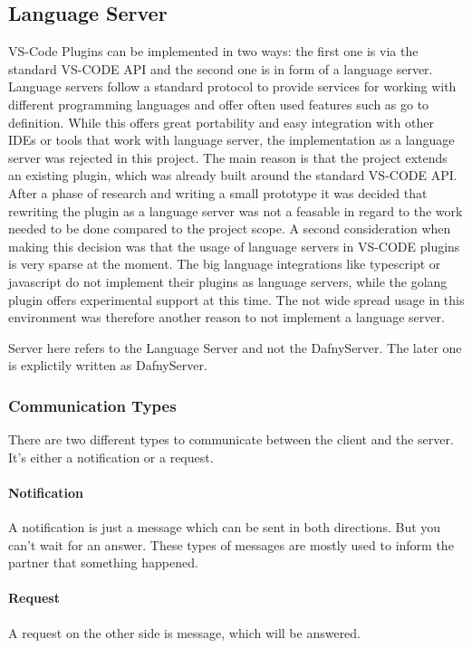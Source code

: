 \subsection{Language Server}

VS-Code Plugins can be implemented in two ways: the first one is via the standard VS-CODE API and the second one is in form of a language server. Language servers follow a standard protocol to provide services for working with different programming languages and offer often used features such as go to definition. While this offers great portability and easy integration with other IDEs or tools that work with language server, the implementation as a language server was rejected in this project. \newline
The main reason is that the project extends an existing plugin, which was already built around the standard VS-CODE API. After a phase of research and writing a small prototype it was decided that rewriting the plugin as a language server was not a feasable in regard to the work needed to be done compared to the project scope. \newline
A second consideration when making this decision was that the usage of language servers in VS-CODE plugins is very sparse at the moment. The big language integrations like typescript or javascript do not implement their plugins as language servers, while the golang plugin offers experimental support at this time. The not wide spread usage in this environment was therefore another reason to not implement a language server.


Server here refers to the Language Server and not the DafnyServer. The later one is explictily written as DafnyServer.

\subsubsection{Communication Types}
There are two different types to communicate between the client and the server. It's either a notification or a request. 

\paragraph{Notification}
A notification is just a message which can be sent in both directions. But you can't wait for an answer. These types of messages are mostly used to inform the partner that something happened. 

\paragraph{Request}
A request on the other side is message, which will be answered.  

